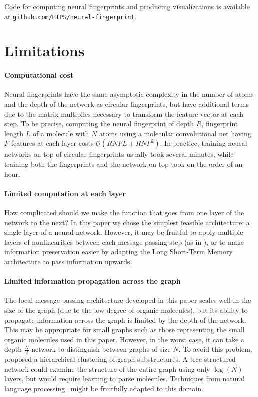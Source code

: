 \documentclass{article}
\newcommand{\citep}{\cite}
\newcommand{\citet}{\cite}
\begin{document}
Code for computing neural fingerprints and producing visualizations is available at \href{http://github.com/HIPS/neural-fingerprint}{\texttt{github.com/HIPS/neural-fingerprint}}.

\section{Limitations}

\paragraph{Computational cost}
Neural fingerprints have the same asymptotic complexity in the number of atoms and the depth of the network as circular fingerprints, but have additional terms due to the matrix multiplies necessary to transform the feature vector at each step.
To be precise, computing the neural fingerprint of depth $R$, fingerprint length $L$ of a molecule with $N$ atoms using a molecular convolutional net having $F$ features at each layer costs $\mathcal{O}(RNFL + RNF^2)$.
In practice, training neural networks on top of circular fingerprints usually took several minutes, while training both the fingerprints and the network on top took on the order of an hour.

\paragraph{Limited computation at each layer}
How complicated should we make the function that goes from one layer of the network to the next?
In this paper we chose the simplest feasible architecture: a single layer of a neural network.
However, it may be fruitful to apply multiple layers of nonlinearities between each message-passing step (as in \cite{graphnn2009}), or to make information preservation easier by adapting the Long Short-Term Memory~\citep{hochreiter1997long} architecture to pass information upwards.

\paragraph{Limited information propagation across the graph}
The local message-passing architecture developed in this paper scales well in the size of the graph (due to the low degree of organic molecules), but its ability to propagate information across the graph is limited by the depth of the network.
This may be appropriate for small graphs such as those representing the small organic molecules used in this paper.
However, in the worst case, it can take a depth $\frac{N}{2}$ network to distinguish between graphs of size $N$.
To avoid this problem, \citet{bruna2013spectral} proposed a hierarchical clustering of graph substructures.
A tree-structured network could examine the structure of the entire graph using only $\log(N)$ layers, but would require learning to parse molecules.
Techniques from natural language processing~\citep{tai2015improved} might be fruitfully adapted to this domain.
\end{document}
